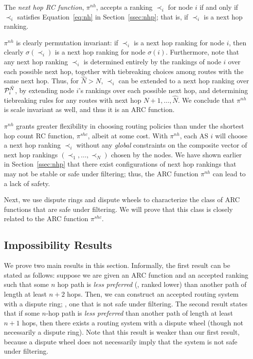 \begin{example}
The {\em next hop RC function}, $\pi^{nh}$, accepts a
ranking $\prec_i$ for node $i$ if and only if $\prec_i$
satisfies Equation~\eqref{eq:nh} in Section~\ref{ssec:nhp}; that is, if
$\prec_i$ is a next hop ranking.

$\pi^{nh}$ is clearly
permutation invariant: if $\prec_i$ is a next hop ranking for node
$i$, then clearly $\sigma(\prec_i)$ is a next hop ranking for node
$\sigma(i)$.  Furthermore, note that any next hop ranking $\prec_i$ is
determined entirely by the rankings of node $i$ over each possible
next hop, together with tiebreaking choices among routes with the same
next hop.  Thus, for $\hat{N} > N$, $\prec_i$ can be extended to a
next hop ranking over $\P_i^{\hat{N}}$, by extending node $i$'s
rankings over each possible next hop, and determining tiebreaking
rules for any routes with next hop $N+1, \ldots, \hat{N}$.  We
conclude that $\pi^{nh}$ is scale invariant as well, and thus it is an
ARC function.

$\pi^{nh}$ grants greater flexibility
in choosing routing policies than under the
shortest hop count RC function, $\pi^{shc}$, albeit at some cost.  With $\pi^{nh}$,
each AS $i$ will choose a next hop ranking $\prec_i$
without any {\em global} constraints on the composite vector of
next hop rankings $(\prec_1, \ldots, \prec_N)$ chosen by
the nodes.  We have shown earlier in Section~\ref{ssec:nhp} that there exist
configurations of next hop rankings that may not be stable
or safe under filtering; thus, the ARC function $\pi^{nh}$ can lead
to a lack of safety.
\end{example}

Next, we use dispute rings and dispute wheels to characterize the
class of ARC functions that are safe under filtering.  We will prove
that this class is closely related to the ARC function $\pi^{shc}$.

\subsection{Impossibility Results}
\label{ssec:localresults}

We prove two main results in this section.
Informally,
the first result can be stated as follows: suppose we are given an
ARC function and an accepted ranking such that some $n$
hop path is {\em less preferred} (\ie, ranked lower) than another path
of length at least 
$n+2$ hops.  
Then, we can construct an
accepted routing system with a dispute ring; \ie, one
that is not safe under filtering.  The second result states that if
some $n$-hop path is {\em less preferred} than another path of
length at least $n+1$ hops, then there exists a routing system with a
dispute wheel (though not necessarily a dispute ring).  Note that this
result is weaker than our first result, because a dispute wheel does not
necessarily imply that the system is not safe under filtering.

